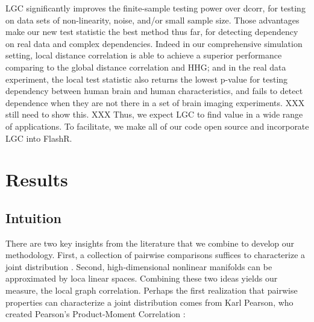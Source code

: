 \documentclass[11pt]{article}
\begin{document}
LGC significantly improves the finite-sample testing power over dcorr, for testing on data sets of non-linearity, noise, and/or small sample size. Those advantages make our new test statistic the best method thus far, for detecting dependency on real data and complex dependencies. Indeed in our comprehensive simulation setting, local distance correlation is able to achieve a superior performance comparing to the global distance correlation and HHG; and in the real data experiment, the local test statistic also returns the lowest p-value for testing dependency between human brain and human characteristics,  and fails to detect dependence when they are not there in a set of brain imaging experiments. XXX still need to show this. XXX  Thus, we expect LGC to find value in a wide range of applications.  To facilitate, we make all of our code open source and incorporate LGC into FlashR.




\section{Results}

\subsection{Intuition}

There are two key insights from the literature that we combine to develop our methodology.  First, a collection of pairwise comparisons  suffices to characterize a joint distribution \cite{Maa1996}.  Second, high-dimensional nonlinear manifolds can be approximated by loca linear spaces.  Combining these two ideas yields our measure, the local graph correlation.  Perhaps the first realization that pairwise properties can characterize a joint distribution comes from  Karl Pearson, who created Pearson's Product-Moment Correlation \cite{Pearson1895}:
\end{document}
